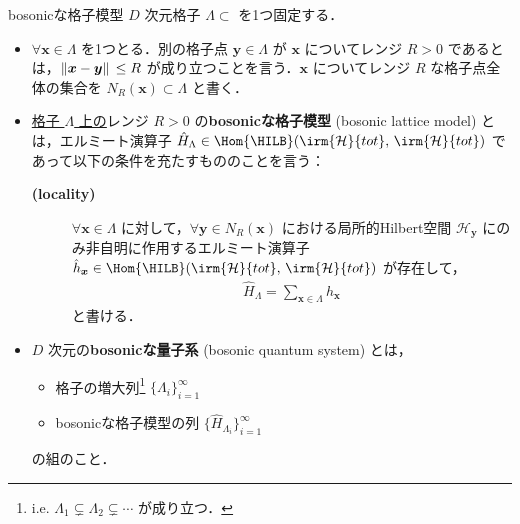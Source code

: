 \documentclass[TQFT_main]{subfiles}
\begin{document}
\begin{mydefph}[label=def:bosonic-lattice-model,breakable]{bosonicな格子模型}
    $D$ 次元格子 $\Lambda \subset$ を1つ固定する．
    \begin{itemize}
        \item $\forall \bm{x} \in \Lambda$ を1つとる．別の格子点 $\bm{y} \in \Lambda$ が $\bm{x}$ についてレンジ $R > 0$ であるとは，$\norm*{\bm{x} - \bm{y}} \le R$ が成り立つことを言う．$\bm{x}$ についてレンジ $R$ な格子点全体の集合を $N_R (\bm{x}) \subset \Lambda$ と書く．
        \item \underline{格子 $\Lambda$ 上の}レンジ $R > 0$ の\textbf{bosonicな格子模型} (bosonic lattice model) とは，エルミート演算子 $\hat{H}_{\Lambda} \in \Hom{\HILB} (\irm{\mathcal{H}}{tot},\, \irm{\mathcal{H}}{tot})$ であって以下の条件を充たすもののことを言う：
        
        \begin{description}
            \item[\textbf{(locality)}] $\forall \bm{x} \in \Lambda$ に対して，$\forall \bm{y} \in N_R(\bm{x})$ における局所的Hilbert空間 $\mathcal{H}_{\bm{y}}$ にのみ非自明に作用するエルミート演算子 $\hat{h}_{\bm{x}} \in \Hom{\HILB} (\irm{\mathcal{H}}{tot},\, \irm{\mathcal{H}}{tot})$ が存在して，
            \begin{align}
                \hat{H}_{\Lambda} = \sum_{\bm{x} \in \Lambda} \hat{h}_{\bm{x}}
            \end{align}
            と書ける．
        \end{description}
        
    \end{itemize}
    
    \tcblower

    \begin{itemize}
        \item $D$ 次元の\textbf{bosonicな量子系} (bosonic quantum system) とは，
        \begin{itemize}
            \item 格子の増大列\footnote{i.e. $\Lambda_1 \subsetneq \Lambda_2 \subsetneq \cdots$ が成り立つ．} $\{\Lambda_i\}_{i=1}^\infty$
            \item bosonicな格子模型の列 $\{\hat{H}_{\Lambda_i}\}_{i=1}^\infty$
        \end{itemize}
        の組のこと．
    \end{itemize}
    
\end{mydefph}
\end{document}
